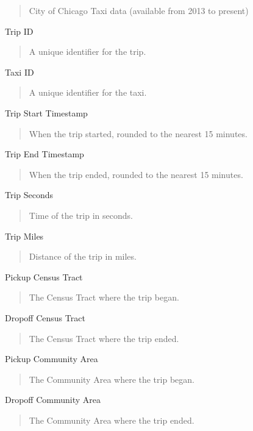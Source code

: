 \documentclass[]{article}
\begin{document}
\begin{quote}
City of Chicago Taxi data (available from 2013 to present)
\end{quote}

Trip ID

\begin{quote}
A unique identifier for the trip.
\end{quote}

Taxi ID

\begin{quote}
A unique identifier for the taxi.
\end{quote}

Trip Start Timestamp

\begin{quote}
When the trip started, rounded to the nearest 15 minutes.
\end{quote}

Trip End Timestamp

\begin{quote}
When the trip ended, rounded to the nearest 15 minutes.
\end{quote}

Trip Seconds

\begin{quote}
Time of the trip in seconds.
\end{quote}

Trip Miles

\begin{quote}
Distance of the trip in miles.
\end{quote}

Pickup Census Tract

\begin{quote}
The Census Tract where the trip began.
\end{quote}

Dropoff Census Tract

\begin{quote}
The Census Tract where the trip ended.
\end{quote}

Pickup Community Area

\begin{quote}
The Community Area where the trip began.
\end{quote}

Dropoff Community Area

\begin{quote}
The Community Area where the trip ended.
\end{quote}
\end{document}

